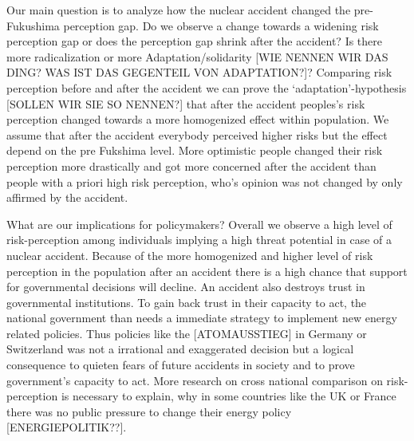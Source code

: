 {Our main question is to analyze how the nuclear accident changed the pre-Fukushima perception gap. Do we observe a change towards a widening risk perception gap or does the perception gap shrink after the accident? Is there more radicalization or more Adaptation/solidarity [WIE NENNEN WIR DAS DING? WAS IST DAS GEGENTEIL VON ADAPTATION?]? Comparing risk perception before and after the accident we can prove the `adaptation'-hypothesis [SOLLEN WIR SIE SO NENNEN?] that after the accident peoples's risk perception changed towards a more homogenized effect within population. We assume that after the accident everybody perceived higher risks but the effect depend on the pre Fukshima level. More optimistic  people changed their risk perception more drastically and got more concerned after the accident  than people with a priori high risk perception, who's opinion was not changed by only affirmed by the accident. 



What are our implications for policymakers? Overall we observe a high level of risk-perception among individuals implying a high threat potential in case of a nuclear accident. Because of the more homogenized and higher level of risk perception in the population after an accident there is a high chance that support for governmental decisions will decline. An accident also destroys trust in governmental institutions. To gain back  trust in their capacity to act, the national government than needs a immediate strategy to implement new energy related policies. Thus policies like the [ATOMAUSSTIEG] in Germany or Switzerland was not a irrational and exaggerated decision but a logical consequence to quieten fears of future accidents in society and to prove government's capacity to act. More research on cross national comparison on risk-perception is necessary to explain, why in some countries like the UK or France there was no public pressure to change their energy policy [ENERGIEPOLITIK??].



}
